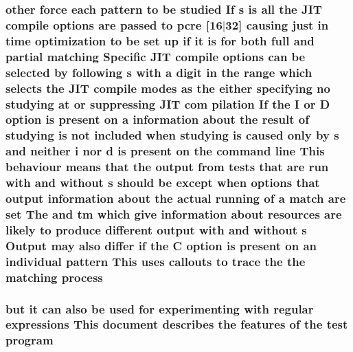 \subsubsection[{\texorpdfstring{process}{process}}]{ other force each {\bf pattern} {\bf to} {\bf be} {\bf studied} If {\bf s} {\bf is} {\bf all} the J\+IT {\bf compile} {\bf options} {\bf are} passed {\bf to} {\bf pcre} \mbox{[}16$\vert$32\mbox{]} causing just {\bf in} {\bf time} optimization {\bf to} {\bf be} {\bf set} up {\bf if} {\bf it} {\bf is} for both full and {\bf partial} {\bf matching} Specific J\+IT {\bf compile} {\bf options} {\bf can} {\bf be} {\bf selected} by following {\bf s} {\bf with} {\bf a} digit {\bf in} the range {\bf which} selects the J\+IT {\bf compile} {\bf modes} {\bf as} the either {\bf specifying} no {\bf studying} at {\bf or} suppressing J\+IT com pilation If the {\bf I} {\bf or} {\bf D} {\bf option} {\bf is} {\bf present} {\bf on} {\bf a} information about the {\bf result} {\bf of} {\bf studying} {\bf is} {\bf not} {\bf included} when {\bf studying} {\bf is} caused only by {\bf s} and neither {\bf i} nor {\bf d} {\bf is} {\bf present} {\bf on} the {\bf command} {\bf line} This behaviour means that the {\bf output} {\bf from} {\bf tests} that {\bf are} {\bf run} {\bf with} and without {\bf s} should {\bf be} {\bf except} when {\bf options} that {\bf output} information about the actual running {\bf of} {\bf a} {\bf match} {\bf are} {\bf set} The and {\bf tm} {\bf which} give information about resources {\bf are} likely {\bf to} produce different {\bf output} {\bf with} and without {\bf s} Output may also differ {\bf if} the {\bf C} {\bf option} {\bf is} {\bf present} {\bf on} an individual {\bf pattern} This uses callouts {\bf to} trace the the {\bf matching} process}\hypertarget{pcretest_8txt_a8ec73ad58a04604170bd96796a2075a8}{}\label{pcretest_8txt_a8ec73ad58a04604170bd96796a2075a8}
\subsubsection[{\texorpdfstring{program}{program}}]{\setlength{\rightskip}{0pt plus 5cm}but {\bf it} {\bf can} also {\bf be} {\bf used} for experimenting {\bf with} regular {\bf expressions} This {\bf document} describes the {\bf features} {\bf of} the test program}\hypertarget{pcretest_8txt_a48917cf15a1089461e55bc56de9a58c3}{}\label{pcretest_8txt_a48917cf15a1089461e55bc56de9a58c3}
